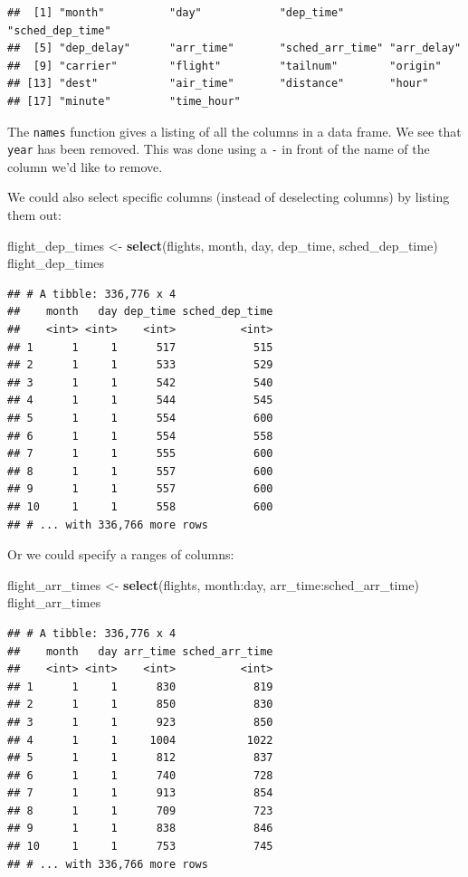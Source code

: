 \documentclass[]{tufte-book}
\newenvironment{Shaded}{\begin{snugshade}}{\end{snugshade}}
\newcommand{\KeywordTok}[1]{\textcolor[rgb]{0.13,0.29,0.53}{\textbf{{#1}}}}
\newcommand{\StringTok}[1]{\textcolor[rgb]{0.31,0.60,0.02}{{#1}}}
\newcommand{\NormalTok}[1]{{#1}}
\begin{document}
\begin{verbatim}
##  [1] "month"          "day"            "dep_time"       "sched_dep_time"
##  [5] "dep_delay"      "arr_time"       "sched_arr_time" "arr_delay"     
##  [9] "carrier"        "flight"         "tailnum"        "origin"        
## [13] "dest"           "air_time"       "distance"       "hour"          
## [17] "minute"         "time_hour"
\end{verbatim}

The \texttt{names} function gives a listing of all the columns in a data
frame. We see that \texttt{year} has been removed. This was done using a
\texttt{-} in front of the name of the column we'd like to remove.

We could also select specific columns (instead of deselecting columns)
by listing them out:

\begin{Shaded}
\begin{Highlighting}[]
\NormalTok{flight_dep_times <-}\StringTok{ }\KeywordTok{select}\NormalTok{(flights, month, day, dep_time, sched_dep_time)}
\NormalTok{flight_dep_times}
\end{Highlighting}
\end{Shaded}

\begin{verbatim}
## # A tibble: 336,776 x 4
##    month   day dep_time sched_dep_time
##    <int> <int>    <int>          <int>
## 1      1     1      517            515
## 2      1     1      533            529
## 3      1     1      542            540
## 4      1     1      544            545
## 5      1     1      554            600
## 6      1     1      554            558
## 7      1     1      555            600
## 8      1     1      557            600
## 9      1     1      557            600
## 10     1     1      558            600
## # ... with 336,766 more rows
\end{verbatim}

Or we could specify a ranges of columns:

\begin{Shaded}
\begin{Highlighting}[]
\NormalTok{flight_arr_times <-}\StringTok{ }\KeywordTok{select}\NormalTok{(flights, month:day, arr_time:sched_arr_time)}
\NormalTok{flight_arr_times}
\end{Highlighting}
\end{Shaded}

\begin{verbatim}
## # A tibble: 336,776 x 4
##    month   day arr_time sched_arr_time
##    <int> <int>    <int>          <int>
## 1      1     1      830            819
## 2      1     1      850            830
## 3      1     1      923            850
## 4      1     1     1004           1022
## 5      1     1      812            837
## 6      1     1      740            728
## 7      1     1      913            854
## 8      1     1      709            723
## 9      1     1      838            846
## 10     1     1      753            745
## # ... with 336,766 more rows
\end{verbatim}
\end{document}

